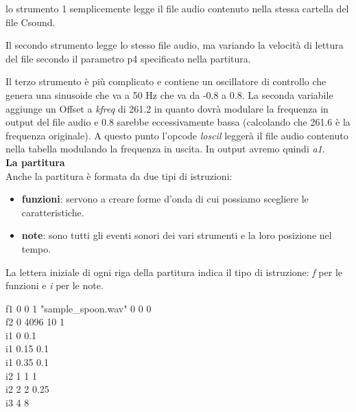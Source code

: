 \documentclass[11pt]{article}
\begin{document}
\begin{multicols*}{2}
\noindent lo strumento 1 semplicemente legge il file audio contenuto nella stessa cartella del file Csound.
 
Il secondo strumento legge lo stesso file audio, ma variando la velocità di lettura del file secondo il parametro p4 specificato nella partitura.

Il terzo strumento è più complicato e contiene un oscillatore di controllo che genera una sinusoide che va a 50 Hz che va da -0.8 a 0.8. La seconda variabile aggiunge un Offset a \textit{kfreq} di 261.2 in quanto dovrà modulare la frequenza in output del file audio e 0.8 sarebbe eccessivamente bassa (calcolando che 261.6 è la frequenza originale). A questo punto l'opcode \textit{loscil} leggerà il file audio contenuto nella tabella modulando la frequenza in uscita. In output avremo quindi \textit{a1}.\\

\textbf{\textsf {La partitura}}\\

\noindent Anche la partitura è formata da due tipi di istruzioni:

\begin{itemize}
\item \textbf{funzioni}: servono a creare forme d'onda di cui possiamo scegliere le caratteristiche.
\item \textbf{note}: sono tutti gli eventi sonori dei vari strumenti e la loro posizione nel tempo.
\end{itemize}

La lettera iniziale di ogni riga della partitura indica il tipo di istruzione: \textit{f} per le funzioni e \textit{i} per le note.

\begin{center}
\begin{minipage}[c]{6.2cm}
\begin{sffamily}
\scriptsize

f1 0 0 1 "sample_spoon.wav" 0 0 0\\
f2 0 4096 10 1\\

i1 0    0.1\\
i1 0.15 0.1\\
i1 0.35 0.1\\

i2 1    1   1\\
i2 2    2   0.25\\

i3 4	   8  \\


\end{sffamily}
\end{minipage}
\end{center}
\end{multicols*}
\end{document}
